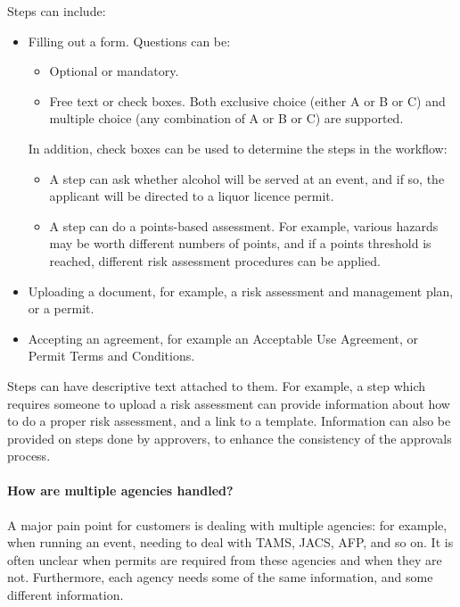 \documentclass[12pt,a4paper,twosided]{article}
\begin{document}
Steps can include:
\begin{itemize}
\item Filling out a form. Questions can be:
  \begin{itemize}
  \item Optional or mandatory.
  \item Free text or check boxes. Both exclusive choice (either A or B or C) and multiple choice (any combination of A or B or C) are supported. 
  \end{itemize}

  In addition, check boxes can be used to determine the steps in the workflow:
  \begin{itemize}
  \item A step can ask whether alcohol will be served at an event, and if so, the applicant will be directed to a liquor licence permit.
  \item A step can do a points-based assessment. For example, various hazards may be worth different numbers of points, and if a points threshold is reached, different risk assessment procedures can be applied.
  \end{itemize}
\item Uploading a document, for example, a risk assessment and management plan, or a permit.
\item Accepting an agreement, for example an Acceptable Use Agreement, or Permit Terms and Conditions.
\end{itemize}

Steps can have descriptive text attached to them. For example, a step which requires someone to upload a risk assessment can provide information about how to do a proper risk assessment, and a link to a template. Information can also be provided on steps done by approvers, to enhance the consistency of the approvals process.

\paragraph{How are multiple agencies handled?}

A major pain point for customers is dealing with multiple agencies: for example, when running an event, needing to deal with TAMS, JACS, AFP, and so on. It is often unclear when permits are required from these agencies and when they are not. Furthermore, each agency needs some of the same information, and some different information. 
\end{document}
